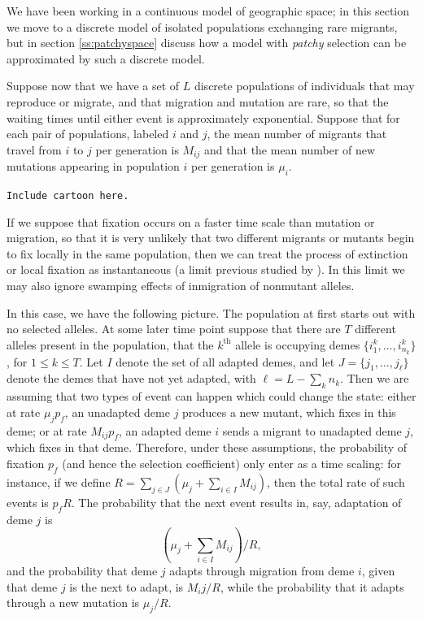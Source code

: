\documentclass{article}
\begin{document}
We have been working in a continuous model of geographic space; 
in this section we move to a discrete model of isolated populations exchanging rare migrants,
but in section \ref{ss:patchyspace} discuss how a model with {\em patchy} selection can be approximated by such a discrete model.

Suppose now that we have a set of $L$ discrete populations of individuals that may reproduce or migrate,
and that migration and mutation are rare, so that the waiting times until either event is approximately exponential.
Suppose that for each pair of populations, labeled $i$ and $j$, the mean number of migrants that travel from $i$ to $j$ per generation
is $M_{ij}$ and that the mean number of new mutations appearing in population $i$ per generation is $\mu_i$.

{\tt Include cartoon here.}

If we suppose that fixation occurs on a faster time scale than mutation or migration,
so that it is very unlikely that two different migrants or mutants begin to fix locally in the same population,
then we can treat the process of extinction or local fixation as instantaneous 
(a limit previous studied by \cite{Slatkin:81}).
In this limit we may also ignore swamping effects of inmigration of nonmutant alleles.

In this case, we have the following picture.
The population at first starts out with no selected alleles. 
At some later time point suppose that there are $T$ different alleles present in the population, 
that the $k^\mathrm{th}$ allele is occupying demes $\{i^k_1, \ldots, i^k_{n_k}\}$, for $1\le k \le T$.
Let $I$ denote the set of all adapted demes, 
and let $J = \{j_1, \ldots, j_\ell\}$ denote the demes that have not yet adapted, with $\ell = L - \sum_k n_k$.
Then we are assuming that two types of event can happen which could change the state:
either at rate $\mu_j p_f$, an unadapted deme $j$ produces a new mutant, which fixes in this deme;
or at rate $M_{ij} p_f$, an adapted deme $i$ sends a migrant to unadapted deme $j$, which fixes in that deme.
Therefore, under these assumptions, the probability of fixation $p_f$ (and hence the selection coefficient)
only enter as a time scaling: for instance,
if we define $R = \sum_{j \in J} \left( \mu_j + \sum_{i \in I} M_{ij} \right)$,
then the total rate of such events is $p_f R$.
The probability that the next event results in, say, adaptation of deme $j$
is 
\[
 \left( \mu_j + \sum_{i \in I} M_{ij} \right) / R,
\]
and the probability that deme $j$ adapts through migration from deme $i$, given that deme $j$ is the next to adapt, is
$M_ij / R$,
while the probability that it adapts through a new mutation is $\mu_j / R$.
\end{document}
